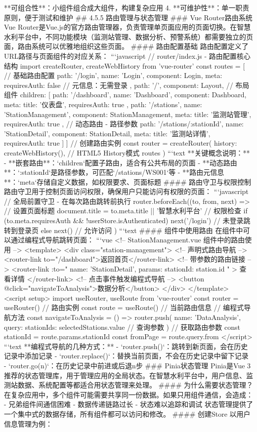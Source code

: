 {{{{{**可组合性**：小组件组合成大组件，构建复杂应用 4. **可维护性**：单一职责原则，便于测试和维护 ## 4.5.5 路由管理与状态管理 ### Vue Router路由系统 Vue Router是Vue.js的官方路由管理器，负责管理单页面应用的页面切换。在智慧水利平台中，不同功能模块（监测站管理、数据分析、预警系统）都需要独立的页面，路由系统可以优雅地组织这些页面。 #### 路由配置基础 路由配置定义了URL路径与页面组件的对应关系： ```javascript // router/index.js - 路由配置核心结构 import { createRouter, createWebHistory } from 'vue-router' const routes = [ // 基础路由配置 { path: '/login', name: 'Login', component: Login, meta: { requiresAuth: false } // 元信息：无需登录 }, { path: '/', component: Layout, // 布局组件 children: [ { path: '/dashboard', name: 'Dashboard', component: Dashboard, meta: { title: '仪表盘', requiresAuth: true } }, { path: '/stations', name: 'StationManagement', component: StationManagement, meta: { title: '监测站管理', requiresAuth: true } }, // 动态路由 - 路径参数 { path: '/stations/:stationId', name: 'StationDetail', component: StationDetail, meta: { title: '监测站详情', requiresAuth: true } } ] } ] // 创建路由实例 const router = createRouter({ history: createWebHistory(), // HTML5 History模式 routes }) ```text **关键概念说明：** - **嵌套路由**：`children`配置子路由，适合有公共布局的页面 - **动态路由**：`:stationId`是路径参数，可匹配`/stations/WS001`等 - **路由元信息**：`meta`存储自定义数据，如权限要求、页面标题 #### 路由守卫与权限控制 路由守卫用于控制页面访问权限，确保用户只能访问有权限的页面： ```javascript // 全局前置守卫 - 在每次路由跳转前执行 router.beforeEach((to, from, next) => { // 设置页面标题 document.title = to.meta.title || '智慧水利平台' // 权限检查 if (to.meta.requiresAuth && !userStore.isAuthenticated) { next('/login') // 未登录跳转到登录页 } else { next() // 允许访问 } }) ```text #### 组件中使用路由 在组件中可以通过编程式导航跳转页面： ```vue <!-- StationManagement.vue 组件中的路由使用 --> <template> <div class="station-management"> <!-- 声明式路由导航 --> <router-link to="/dashboard">返回首页</router-link> <!-- 带参数的路由链接 --> <router-link :to="{ name: 'StationDetail', params: { stationId: station.id } }" > 查看详情 </router-link> <!-- 点击事件触发编程式导航 --> <button @click="navigateToAnalysis">数据分析</button> </div> </template> <script setup> import { useRouter, useRoute } from 'vue-router' const router = useRouter() // 路由实例 const route = useRoute() // 当前路由信息 // 编程式导航方法 const navigateToAnalysis = () => { router.push({ name: 'DataAnalysis', query: { stationIds: selectedStations.value } // 查询参数 }) } // 获取路由参数 const stationId = route.params.stationId const fromPage = route.query.from </script> ```text **编程式导航的几种方式：** - `router.push()`：跳转到新页面，会在历史记录中添加记录 - `router.replace()`：替换当前页面，不会在历史记录中留下记录 - `router.go(n)`：在历史记录中前进或后退n步 ### Pinia状态管理 Pinia是Vue 3推荐的状态管理库，用于管理应用的全局状态。在智慧水利平台中，用户信息、监测站数据、系统配置等都适合用状态管理来处理。 #### 为什么需要状态管理？ 在复杂应用中，多个组件可能需要共享同一份数据。如果只用组件通信，会造成： - 兄弟组件间通信困难 - 数据传递链路过长 - 状态难以追踪和调试 状态管理提供了一个集中式的数据存储，所有组件都可以访问和修改。 #### 创建Store 以用户信息管理为例： }}}}}
